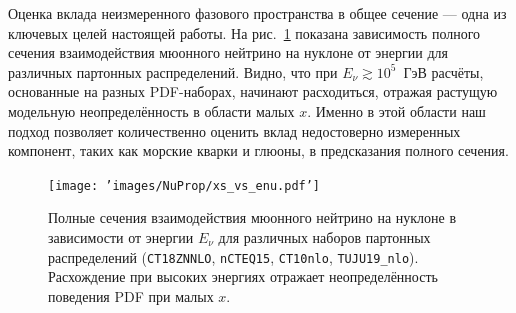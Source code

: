 Оценка вклада неизмеренного фазового пространства в общее сечение — одна из ключевых целей настоящей работы. На рис.~\ref{fig:xsec_total} показана зависимость полного сечения взаимодействия мюонного нейтрино на нуклоне от энергии для различных партонных распределений. Видно, что при $E_\nu \gtrsim 10^5$~ГэВ расчёты, основанные на разных PDF-наборах, начинают расходиться, отражая растущую модельную неопределённость в области малых $x$. Именно в этой области наш подход позволяет количественно оценить вклад недостоверно измеренных компонент, таких как морские кварки и глюоны, в предсказания полного сечения.


\begin{figure}[!h]
\centering
\texttt{[image: 'images/NuProp/xs\_vs\_enu.pdf']}
\caption{Полные сечения взаимодействия мюонного нейтрино на нуклоне в зависимости от энергии $E_\nu$ для различных наборов партонных распределений (\texttt{CT18ZNNLO}, \texttt{nCTEQ15}, \texttt{CT10nlo}, \texttt{TUJU19_nlo}). Расхождение при высоких энергиях отражает неопределённость поведения PDF при малых $x$.} 
\label{fig:xsec_total}
\end{figure}
